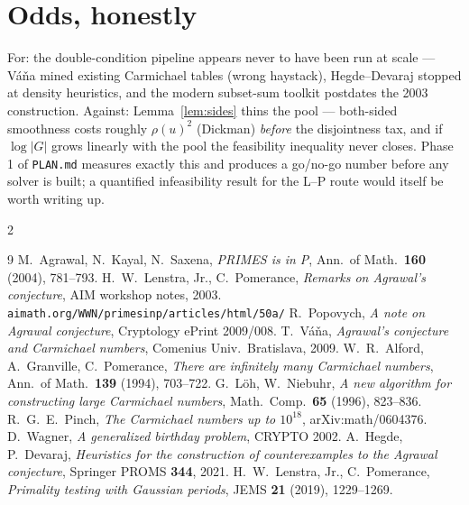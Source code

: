 \documentclass[10pt]{article}
\begin{document}
\section{Odds, honestly}

For: the double-condition pipeline appears never to have been run at scale ---
V\'a\v{n}a mined existing Carmichael tables (wrong haystack), Hegde--Devaraj
\cite{HD21} stopped at density heuristics, and the modern subset-sum toolkit
postdates the 2003 construction. Against: Lemma~\ref{lem:sides} thins the pool
--- both-sided smoothness costs roughly $\rho(u)^2$ (Dickman) \emph{before}
the disjointness tax, and if $\log|G|$ grows linearly with the pool the
feasibility inequality never closes. Phase 1 of \texttt{PLAN.md} measures
exactly this and produces a go/no-go number before any solver is built; a
quantified infeasibility result for the L--P route would itself be worth
writing up.

\begin{multicols}{2}
\begin{thebibliography}{9}\itemsep0pt\footnotesize
{} M.~Agrawal, N.~Kayal, N.~Saxena, \emph{PRIMES is in P},
Ann.\ of Math.\ \textbf{160} (2004), 781--793.
 H.~W.~Lenstra, Jr., C.~Pomerance, \emph{Remarks on
Agrawal's conjecture}, AIM workshop notes, 2003.
\texttt{aimath.org/WWN/primesinp/articles/html/50a/}
 R.~Popovych, \emph{A note on Agrawal conjecture},
Cryptology ePrint 2009/008.
 T.~V\'a\v{n}a, \emph{Agrawal's conjecture and Carmichael
numbers}, Comenius Univ.\ Bratislava, 2009.
 W.~R.~Alford, A.~Granville, C.~Pomerance, \emph{There are
infinitely many Carmichael numbers}, Ann.\ of Math.\ \textbf{139} (1994),
703--722.
 G.~L\"oh, W.~Niebuhr, \emph{A new algorithm for constructing
large Carmichael numbers}, Math.\ Comp.\ \textbf{65} (1996), 823--836.
 R.~G.~E.~Pinch, \emph{The Carmichael numbers up to $10^{18}$},
arXiv:math/0604376.
 D.~Wagner, \emph{A generalized birthday problem}, CRYPTO 2002.
 A.~Hegde, P.~Devaraj, \emph{Heuristics for the construction of
counterexamples to the Agrawal conjecture}, Springer PROMS \textbf{344}, 2021.
 H.~W.~Lenstra, Jr., C.~Pomerance, \emph{Primality testing
with Gaussian periods}, JEMS \textbf{21} (2019), 1229--1269.
\end{thebibliography}
\end{multicols}
\end{document}
